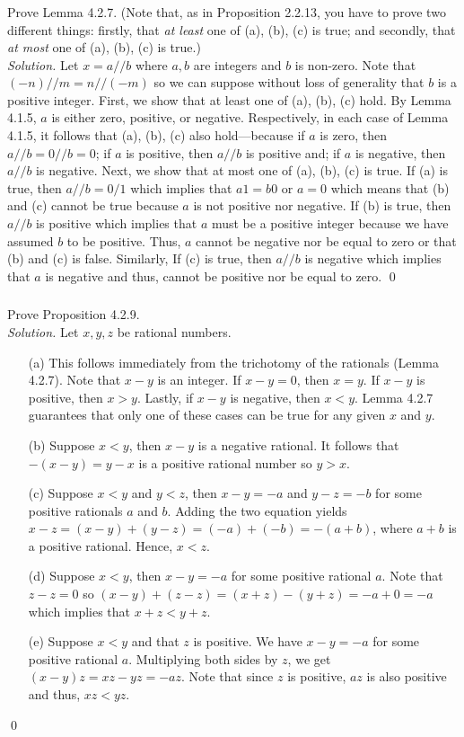 \documentclass{amsart}
\theoremstyle{definition}
\newcommand{\soln}{\newline\textit{Solution.} }
\begin{document}
\subsubsection{} Prove Lemma 4.2.7. (Note that, as in Proposition 2.2.13, you have to prove two different things: firstly, that \textit{at least} one of (a), (b), (c) is true; and secondly, that \textit{at most} one of (a), (b), (c) is true.) \\
\soln Let $x=a//b$ where $a,b$ are integers and $b$ is non-zero. Note that $(-n)//m=n//(-m)$ so we can suppose without loss of generality that $b$ is a positive integer. First, we show that at least one of (a), (b), (c) hold. By Lemma 4.1.5, $a$ is either zero, positive, or negative. Respectively, in each case of Lemma 4.1.5, it follows that (a), (b), (c) also hold---because if $a$ is zero, then $a//b=0//b=0$; if $a$ is positive, then $a//b$ is positive and; if $a$ is negative, then $a//b$ is negative. Next, we show that at most one of (a), (b), (c) is true. If (a) is true, then $a//b=0/1$ which implies that $a1=b0$ or $a=0$ which means that (b)
and (c) cannot be true because $a$ is not positive nor negative. If (b) is true, then $a//b$ is positive which implies that $a$ must be a positive integer because we have assumed $b$ to be positive. Thus, $a$ cannot be negative nor be equal to zero or that (b) and (c) is false. Similarly, If (c) is true, then $a//b$ is negative which implies that $a$ is negative and thus, cannot be positive nor be equal to zero. \qed\\

\subsubsection{} Prove Proposition 4.2.9. \\
\soln Let $x,y,z$ be rational numbers.
\begin{enumerate}
\item[(a)] This follows immediately from the trichotomy of the rationals (Lemma 4.2.7). Note that $x-y$ is an integer. If $x-y=0$, then $x=y$. If $x-y$ is positive, then $x>y$. Lastly, if $x-y$ is negative, then $x<y$. Lemma 4.2.7 guarantees that only one of these cases can be true for any given $x$ and $y$. 
\item[(b)] Suppose $x<y$, then $x-y$ is a negative rational. It follows that $-(x-y)=y-x$ is a positive rational number so $y>x$.
\item[(c)] Suppose $x<y$ and $y<z$, then $x-y=-a$ and $y-z=-b$ for some positive rationals $a$ and $b$. Adding the two equation yields $x-z=(x-y)+(y-z)=(-a)+(-b)=-(a+b)$, where $a+b$ is a positive rational. Hence, $x<z$.
\item[(d)] Suppose $x<y$, then $x-y=-a$ for some positive rational $a$. Note that $z-z=0$ so $(x-y)+(z-z)=(x+z)-(y+z)=-a+0=-a$ which implies that $x+z<y+z$. 
\item[(e)] Suppose $x<y$ and that $z$ is positive. We have $x-y=-a$ for some positive rational $a$. Multiplying both sides by $z$, we get $(x-y)z=xz-yz=-az$. Note that since $z$ is positive, $az$ is also positive and thus, $xz<yz$. 
\end{enumerate}
\qed \\ 
\end{document}
